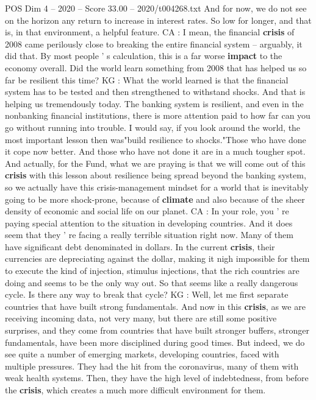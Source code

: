 \begin{textsample}{POS Dim 4 – 2020 – Score 33.00 – 2020/t004268.txt}
And for now, we do not see on the horizon any return to increase in interest rates.
So low for longer, and that is, in that environment, a helpful feature.
CA : I mean, the financial \textbf{crisis} of 2008 came perilously close to breaking the entire financial system -- arguably, it did that.
By most people ' s calculation, this is a far worse \textbf{impact} to the economy overall.
Did the world learn something from 2008 that has helped us so far be resilient this time?
KG : What the world learned is that the financial system has to be tested and then strengthened to withstand shocks.
And that is helping us tremendously today.
The banking system is resilient, and even in the nonbanking financial institutions, there is more attention paid to how far can you go without running into trouble.
I would say, if you look around the world, the most important lesson then was"build resilience to shocks."Those who have done it cope now better.
And those who have not done it are in a much tougher spot.
And actually, for the Fund, what we are praying is that we will come out of this \textbf{crisis} with this lesson about resilience being spread beyond the banking system, so we actually have this crisis-management mindset for a world that is inevitably going to be more shock-prone, because of \textbf{climate} and also because of the sheer density of economic and social life on our planet.
CA : In your role, you ' re paying special attention to the situation in developing countries.
And it does seem that they ' re facing a really terrible situation right now.
Many of them have significant debt denominated in dollars.
In the current \textbf{crisis}, their currencies are depreciating against the dollar, making it nigh impossible for them to execute the kind of injection, stimulus injections, that the rich countries are doing and seems to be the only way out.
So that seems like a really dangerous cycle.
Is there any way to break that cycle?
KG : Well, let me first separate countries that have built strong fundamentals.
And now in this \textbf{crisis}, as we are receiving incoming data, not very many, but there are still some positive surprises, and they come from countries that have built stronger buffers, stronger fundamentals, have been more disciplined during good times.
But indeed, we do see quite a number of emerging markets, developing countries, faced with multiple pressures.
They had the hit from the coronavirus, many of them with weak health systems.
Then, they have the high level of indebtedness, from before the \textbf{crisis}, which creates a much more difficult environment for them.

\end{textsample}
